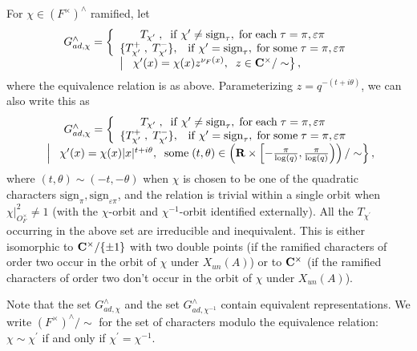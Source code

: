 \documentclass[11pt, a4paper]{article}
\begin{document}
For $\chi \in (F^{\times })^{\wedge }$ ramified, let
\[
\begin{array}{c}
G_{ad,\chi }^{\wedge }=\left\{ 
\begin{array}{c}
T_{\chi ^{\prime }}\;,\; {\rm \;if\;}\chi ^{\prime }\neq \mathrm{sign}_\tau ,\;{\rm %
for\;each}\;\tau =\pi ,\varepsilon \pi \\ 
\{T_{\chi ^{\prime }}^{+}\;,\;T_{\chi ^{\prime }}^{-}\},\;\;{\rm \;if\;}\chi
^{\prime }=\mathrm{sign}_\tau ,\;{\rm for\;some}\;\tau =\pi ,\varepsilon \pi
\end{array}
\right. \\ 
\left.\;\middle|\;\;\;\chi ^{\prime }(x)=\chi (x)z^{\nu _F(x)},\;\;z\in {\bf C}^{\times }/%
\sim\right\},
\end{array}
\]
where the equivalence relation is as above. Parameterizing $z=q^{-(t+i\theta )}$, we can also write this as
\[
\begin{array}{c}
G_{ad,\chi }^{\wedge }=\left\{ 
\begin{array}{c}
T_{\chi ^{\prime }}\;,\; {\rm \;if\;}\chi ^{\prime }\neq \mathrm{sign}_\tau ,\;{\rm %
for\;each}\;\tau =\pi ,\varepsilon \pi \\ 
\{T_{\chi ^{\prime }}^{+}\;,\;T_{\chi ^{\prime }}^{-}\},\;\;{\rm \;if\;}\chi
^{\prime }=\mathrm{sign}_\tau ,\;{\rm for\;some}\;\tau =\pi ,\varepsilon \pi
\end{array}
\right. \\ 
\left.\;\middle|\;\;\;\chi ^{\prime }(x)=\chi (x)|x|^{t+i\theta
},\;\; {\rm some}\;(t,\theta )\in \left({\bf R}\times \left[-\frac \pi {\log (q)},\frac \pi {\log
(q)}\right)\right)/\sim\right\},
\end{array}
\]
where $(t,\theta )\sim (-t,-\theta )$ when $\chi $ is chosen to be one of the quadratic characters $\mathrm{sign}_\pi ,\mathrm{sign}_{\varepsilon \pi }$, and the relation is trivial within a single orbit when $\chi |_{O_F^{\times }}^2\neq 1$ (with the $\chi $-orbit and $\chi ^{-1}$-orbit identified externally). All the $T_{\chi ^{\prime }}$
occurring in the above set are irreducible and inequivalent. This is either
isomorphic to ${\bf C}^{\times }/\{\pm 1\}$ with two double points (if the
ramified characters of order two occur in the orbit of $\chi $ under $%
X_{un}(A)$) or to ${\bf C}^{\times }$ (if the ramified characters of order two don't occur in the orbit of $\chi $ under $X_{un}(A)$).

Note that the set $G_{ad,\chi }^{\wedge }$ and the set $G_{ad,\chi
^{-1}}^{\wedge }$ contain equivalent representations. We write $(F^{\times
})^{\wedge }/\sim$ for the set of characters modulo the equivalence
relation: $\chi \sim \chi ^{\prime }$ if and only if $\chi ^{\prime }=\chi
^{-1}$.
\end{document}

